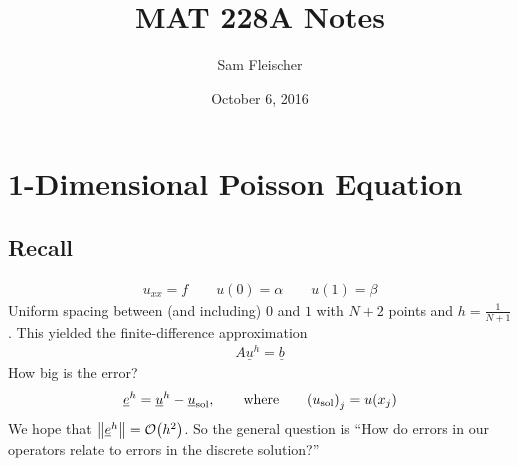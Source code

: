\documentclass{article}
\title{MAT 228A Notes}
\author{Sam Fleischer}
\date{October 6, 2016}
\begin{document}
    \maketitle

    \section{1-Dimensional Poisson Equation}
        \subsection{Recall}
            \begin{align}
                u_{xx} = f \qquad u(0) = \alpha \qquad u(1) = \beta
            \end{align}
            Uniform spacing between (and including) $0$ and $1$ with $N+2$ points and $h = \frac{1}{N+1}$.  This yielded the finite-difference approximation
            \begin{align}
                A\underline{u}^h = \underline{b}
            \end{align}
            How big is the error?
            \begin{align}
                \underline{e}^h = \underline{u}^h - \underline{u}_\text{sol}, \qquad \text{where} \qquad \qty(u_\text{sol})_j = u(x_j)
            \end{align}
            We hope that $\norm{\underline{e}^h} = \order{h^2}$.  So the general question is ``How do errors in our operators relate to errors in the discrete solution?''
\end{document}
